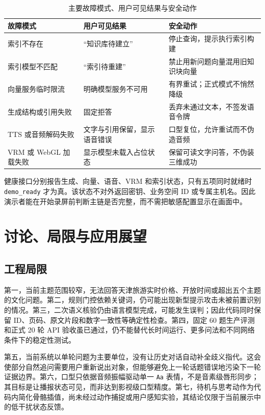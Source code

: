 \documentclass[UTF8,zihao=-4,fontset=none,twoside]{ctexart}
\newcommand{\code}[1]{\mbox{\texttt{#1}}\nobreak}
\begin{document}
\begin{table}[htbp]
\centering
\caption{主要故障模式、用户可见结果与安全动作}
\label{tab:failure-modes}
\small
\begin{tabularx}{\linewidth}{@{}P{35mm}Y Y@{}}
\toprule
故障模式 & 用户可见结果 & 安全动作 \\
\midrule
索引不存在 & “知识库待建立” & 停止查询，提示执行索引构建 \\
索引模型不匹配 & “索引待重建” & 禁止用新问题向量混用旧知识块向量 \\
向量服务临时限流 & 明确模型服务不可用 & 有界重试；正式模式不悄然降级 \\
生成结构或引用失败 & 固定拒答 & 丢弃未通过文本，不签发语音令牌 \\
TTS 或音频解码失败 & 文字与引用保留，显示语音错误 & 口型复位，允许重试而不伪造音频 \\
VRM 或 WebGL 加载失败 & 显示模型未载入占位状态 & 保留可读文字问答，不伪装三维成功 \\
\bottomrule
\end{tabularx}
\end{table}

健康接口分别报告生成、向量、语音、VRM 和索引状态，只有五项同时就绪时 \code{demo\_ready} 才为真。该状态不对外返回密钥、业务空间 ID 或专属主机名。因此演示者能在开始录屏前判断主链是否完整，而不需把敏感配置显示在画面中。

\section{讨论、局限与应用展望}

\subsection{工程局限}

第一，当前主题范围较窄，无法回答天津旅游实时价格、开放时间或超出五个主题的文化问题。第二，规则门控依赖关键词，仍可能出现新型提示攻击未被前置识别的情况。第三，二次语义核验仍由语言模型完成，可能发生误判；因此代码同时保留 ID、页码、原文片段和数字一致性等确定性检查。第四，固定 60 题生产评测和正式 20 轮 API 验收虽已通过，仍不能替代长时间运行、更多问法和不同网络条件下的稳定性测试。

第五，当前系统以单轮问题为主要单位，没有让历史对话自动补全歧义指代。这会使部分自然追问需要用户重新说出对象，但能够避免上一轮话题错误地污染下一轮证据边界。第六，口型只依据音频振幅驱动单一 \code{Aa} 表情，不是音素级唇形同步；其目标是让播报状态可见，而非达到影视级口型精度。第七，待机与思考动作为代码内简化骨骼插值，尚未经过动作捕捉或用户感知实验，其结论仅限于当前展示中的低干扰状态反馈。
\end{document}
